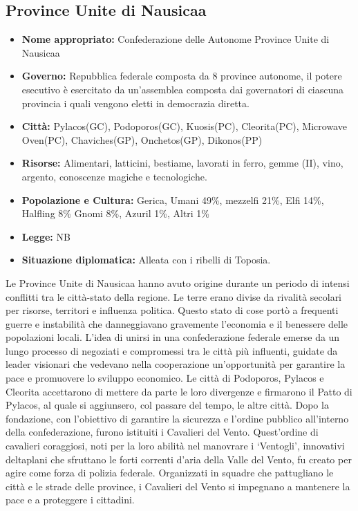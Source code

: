 \documentclass[10pt, a4paper]{report}
\begin{document}
\begin{multicols}{2}
\subsection*{Province Unite di Nausicaa}
\begin{itemize}
	\item \textbf{Nome appropriato:} Confederazione delle Autonome Province Unite di Nausicaa
	\item \textbf{Governo:} Repubblica federale composta da 8 province autonome, il potere esecutivo è esercitato da un'assemblea composta dai governatori di ciascuna provincia i quali vengono eletti in democrazia diretta. 
	\item \textbf{Città:} Pylacos(GC), Podoporos(GC), Kuosis(PC), Cleorita(PC), Microwave Oven(PC), Chaviches(GP), Onchetos(GP), Dikonos(PP)
	\item \textbf{Risorse:} Alimentari, latticini, bestiame, lavorati in ferro, gemme (II), vino, argento, conoscenze magiche e tecnologiche.
	\item \textbf{Popolazione e Cultura:} Gerica, Umani 49\%, mezzelfi 21\%, Elfi 14\%, Halfling 8\% Gnomi 8\%, Azuril 1\%, Altri 1\%
	\item \textbf{Legge:} NB
	\item \textbf{Situazione diplomatica:} Alleata con i ribelli di Toposia.
\end{itemize}
Le Province Unite di Nausicaa hanno avuto origine durante un periodo di intensi conflitti tra le città-stato della regione. Le terre erano divise da rivalità secolari per risorse, territori e influenza politica. Questo stato di cose portò a frequenti guerre e instabilità che danneggiavano gravemente l'economia e il benessere delle popolazioni locali. L'idea di unirsi in una confederazione federale emerse da un lungo processo di negoziati e compromessi tra le città più influenti, guidate da leader visionari che vedevano nella cooperazione un'opportunità per garantire la pace e promuovere lo sviluppo economico. Le città di Podoporos, Pylacos e Cleorita accettarono di mettere da parte le loro divergenze e firmarono il Patto di Pylacos, al quale si aggiunsero, col passare del tempo, le altre città. Dopo la fondazione, con l'obiettivo di garantire la sicurezza e l'ordine pubblico all'interno della confederazione, furono istituiti i Cavalieri del Vento. Quest'ordine di cavalieri coraggiosi, noti per la loro abilità nel manovrare i \enquote*{Ventogli}, innovativi deltaplani che sfruttano le forti correnti d'aria della Valle del Vento, fu creato per agire come forza di polizia federale. Organizzati in squadre che pattugliano le città e le strade delle province, i Cavalieri del Vento si impegnano a mantenere la pace e a proteggere i cittadini.


\end{multicols}
\end{document}
